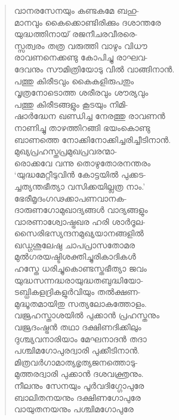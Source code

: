 \begin{verse}
വാനരസേനയും കണ്ടകമേ ബഹു-\\
മാനവും കൈക്കൊണ്ടിരിക്കും ദശാന്തരേ\\
യുദ്ധത്തിനായ് രജനീചരവീരരെ-\\
സ്സത്വരം തത്ര വരുത്തി വാഴും വിധൗ\\
രാവണനെക്കണ്ടു കോപിച്ചു രാഘവ-\\
ദേവനും സൗമിത്രിയോടു വില്‍ വാങ്ങിനാന്‍.\\
പത്തു കിരീടവും കൈകളിരുപതും\\
വൃത്രനോടൊത്ത ശരീരവും ശൗര്യവും\\
പത്തു കിരീടങ്ങളും കൂടയും നിമി-\\
ഷാര്‍ദ്ധേന ഖണ്ഡിച്ച നേരത്തു രാവണന്‍\\
നാണിച്ചു താഴത്തിറങ്ങി ഭയംകൊണ്ടു\\
ബാണത്തെ നോക്കിനോക്കിച്ചരിച്ചീടിനാന്‍.\\
മുഖ്യപ്രഹസ്തപ്രമുഖപ്രവരന്മാ-\\
രൊക്കവേ വന്നു തൊഴുതോരനന്തരം\\
‘യുദ്ധമേറ്റീടുവിന്‍ കോട്ടയില്‍ പുക്കട-\\
ച്ചത്യന്തഭീത്യാ വസിക്കയില്ലത്ര നാം.’\\
ഭേരീമൃദംഗഢക്കാപണവാനക-\\
ദാരുണഗോമുഖാദ്യങ്ങള്‍ വാദ്യങ്ങളും\\
വാരണാശ്വോഷ്ട്രഖര ഹരി ശാര്‍ദൂല-\\
സൈരിഭസ്യന്ദനമുഖ്യയാനങ്ങളില്‍\\
ഖഡ്ഗശൂലേഷു ചാപപ്രാസതോമര\\
മുല്‍ഗരയഷ്ടിശക്തിച്ചുരികാദികള്‍\\
ഹസ്തേ ധരിച്ചുകൊണ്ടസ്തഭീത്യാ ജവം\\
യുദ്ധസന്നദ്ധരായുദ്ധതബുദ്ധിയോ-\\
ടബ്ധികളദ്രികളുര്‍വിയും തല്‍ക്ഷണ-\\
മുദ്ധൂതമായിതു സത്യലോകത്തോളം.\\
വജ്രഹസ്താശയില്‍ പുക്കാന്‍ പ്രഹസ്തനും\\
വജ്രദംഷ്ട്രന്‍ തഥാ ദക്ഷിണദിക്കിലും\\
ദുശ്ച്യവനാരിയാം മേഘനാദന്‍ തദാ\\
പശ്ചിമഗോപുരദ്വാരി പുക്കീടിനാന്‍.\\
മിത്രവര്‍ഗാമാത്യഭൃത്യജനത്തൊടു-\\
മുത്തരദ്വാരി പുക്കാന്‍ ദശവക്ത്രനും.\\
നീലനും സേനയും പൂര്‍വദിഗ്ഗോപുരേ\\
ബാലിതനയനും ദക്ഷിണഗോപുരേ\\
വായുതനയനും പശ്ചിമഗോപുരേ\\

\end{verse}
